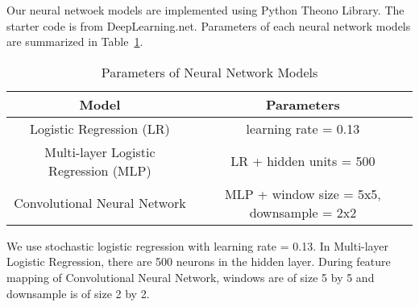 Our neural netwoek models are implemented using Python Theono Library. The
starter code is from DeepLearning.net. Parameters of each neural
network models are summarized in Table~\ref{params}.
\vspace{-7pt}
\begin{table}[!htbp]
\centering
\caption{Parameters of Neural Network Models}
\label{params}
\begin{tabular}{| c | c |}
\hline
Model & Parameters \\
\hline
Logistic Regression (LR) & learning rate = 0.13 \\
Multi-layer Logistic Regression (MLP) & LR + hidden units = 500 \\
Convolutional Neural Network & MLP + window size = 5x5, downsample = 2x2\\
\hline
\end{tabular}
\end{table}

We use stochastic logistic regression with learning rate = 0.13.
In Multi-layer Logistic Regression, there are 500 neurons in the hidden
layer. During feature mapping of Convolutional Neural Network, windows
are of size 5 by 5 and downsample is of size 2 by 2.
